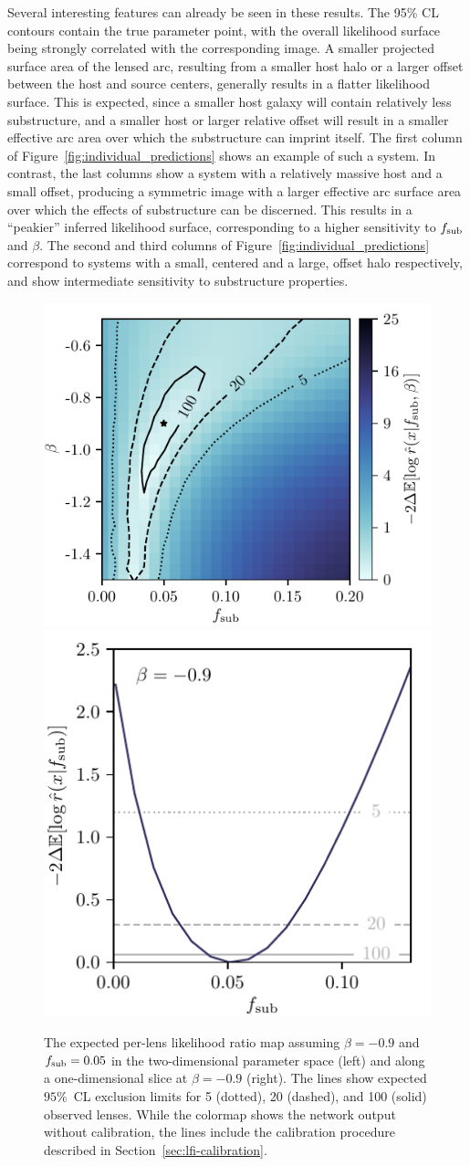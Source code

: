 \documentclass[twocolumn]{aastex63}
\begin{document}
Several interesting features can already be seen in these results. The 95\% CL contours contain the true parameter point, with the overall likelihood surface being strongly correlated with the corresponding image. A smaller projected surface area of the lensed arc, resulting from a smaller host halo or a larger offset between the host and source centers, generally results in a flatter likelihood surface. This is expected, since a smaller host galaxy will contain relatively less substructure, and a smaller host or larger relative offset will result in a smaller effective arc area over which the substructure can imprint itself. The first column of Figure~\ref{fig:individual_predictions} shows an example of such a system. In contrast, the last columns show a system with a relatively massive host and a small offset, producing a symmetric image with a larger effective arc surface area over which the effects of substructure can be discerned. This results in a ``peakier'' inferred likelihood surface, corresponding to a higher sensitivity to $f_{\mathrm{sub}}$ and $\beta$. The second and third columns of Figure~\ref{fig:individual_predictions} correspond to systems with a small, centered and a large, offset halo respectively, and show intermediate sensitivity to substructure properties.

\begin{figure}
  \centering
  \includegraphics[height=0.4\textwidth]{figures/expected_likelihood_map}%
  \hspace*{0.075\textwidth}%
  \includegraphics[height=0.4\textwidth]{figures/expected_likelihood_slice}%
  \hspace*{0.052\textwidth}%
  \caption{The expected per-lens likelihood ratio map assuming $\beta = -0.9$ and $f_{\mathrm{sub}} = 0.05$ in the two-dimensional parameter space (left) and along a one-dimensional slice at $\beta = -0.9$ (right). The lines show expected $95\%$~CL exclusion limits for 5 (dotted), 20 (dashed), and 100 (solid) observed lenses. While the colormap shows the network output without calibration, the lines include the calibration procedure described in Section~\ref{sec:lfi-calibration}. }
  \label{fig:expected_likelihood}
\end{figure}
\end{document}
